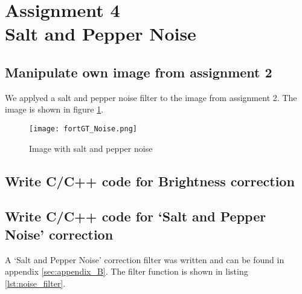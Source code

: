 \section {Assignment 4 \\ {Salt and Pepper Noise}}
\label {sec:assignment_4}

\subsection{Manipulate own image from assignment 2}

We applyed a salt and pepper noise filter to the image from assignment 2. The image is shown in figure \ref{fig:fortGT_Noise}.

\begin{figure}[h!]
    \centering
    \texttt{[image: fortGT\_Noise.png]}
    \caption{Image with salt and pepper noise}
    \label{fig:fortGT_Noise}
\end{figure}

\subsection{Write C/C++ code for Brightness correction}

\subsection{Write C/C++ code for ‘Salt and Pepper Noise’ correction}

A ‘Salt and Pepper Noise’ correction filter was written and can be found in appendix \ref{sec:appendix_B}. The filter function is shown in listing \ref{lst:noise_filter}.

